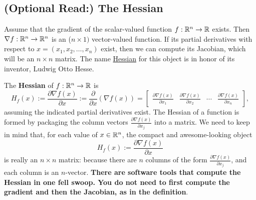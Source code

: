 \Qed



\subsection{(Optional Read:) The Hessian}

Assume that the gradient of the scalar-valued function $f:\mathbb R^{n} \to \mathbb R$ exists. Then $\nabla f: \mathbb R^{n} \to \mathbb R^{n}$ is an ($n \times 1)$ vector-valued function. If its partial derivatives with respect to $x=(x_1, x_2, \ldots, x_n)$ exist, then we can compute its Jacobian, which will be an $n \times n$ matrix. The name \href{https://en.wikipedia.org/wiki/Hessian_matrix}{Hessian} for this object is in honor of its inventor, Ludwig Otto Hesse.

\begin{tcolorbox}[colback=mylightblue, title = {\bf Hessian of a Function}, breakable]

\begin{definition} 
\label{def:DefHessian}
The \textbf{Hessian} of $f:\mathbb R^{n} \to \mathbb R$ is
\begin{equation}
    \label{eq:DefHessian}
   H_f(x):= \frac{\partial \nabla f(x)}{\partial x} := \frac{\partial}{\partial x}\left(  \nabla f(x)\right) =  \left[\begin{array}{cccc}
      \frac{\partial \nabla f(x)}{\partial x_1} & \frac{\partial \nabla  f(x)}{\partial x_2} & \cdots & \frac{\partial \nabla f(x)}{\partial x_n}
    \end{array} \right],
\end{equation}
assuming the indicated partial derivatives exist. 
The Hessian of a function is formed by packaging the column vectors $\frac{\partial \nabla f(x)}{\partial x_j}$ into a matrix. We need to keep in mind that, for each value of $x\in \mathbb R^{n}$, the compact and awesome-looking object
$$ H_f(x):= \frac{\partial \nabla f(x)}{\partial x} $$
is really an $n \times n$ matrix: because there are $n$ columns of the form $ \frac{\partial \nabla f(x)}{\partial x_j}$, and each column is an $n$-vector. \textbf{There are software tools that compute the Hessian in one fell swoop. You do not need to first compute the gradient and then the Jacobian, as in the definition}. 

\end{definition}
\end{tcolorbox}


\vspace*{.2cm}

